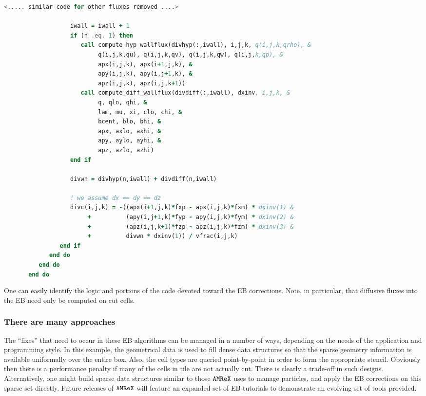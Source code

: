 \begin{lstlisting}[language=Fortran]
           <..... similar code for other fluxes removed ....>

                   iwall = iwall + 1
                   if (n .eq. 1) then
                      call compute_hyp_wallflux(divhyp(:,iwall), i,j,k, q(i,j,k,qrho), &
                           q(i,j,k,qu), q(i,j,k,qv), q(i,j,k,qw), q(i,j,k,qp), &
                           apx(i,j,k), apx(i+1,j,k), &
                           apy(i,j,k), apy(i,j+1,k), &
                           apz(i,j,k), apz(i,j,k+1))
                      call compute_diff_wallflux(divdiff(:,iwall), dxinv, i,j,k, &
                           q, qlo, qhi, &
                           lam, mu, xi, clo, chi, &
                           bcent, blo, bhi, &
                           apx, axlo, axhi, &
                           apy, aylo, ayhi, &
                           apz, azlo, azhi)
                   end if

                   divwn = divhyp(n,iwall) + divdiff(n,iwall)

                   ! we assume dx == dy == dz
                   divc(i,j,k) = -((apx(i+1,j,k)*fxp - apx(i,j,k)*fxm) * dxinv(1) &
                        +          (apy(i,j+1,k)*fyp - apy(i,j,k)*fym) * dxinv(2) &
                        +          (apz(i,j,k+1)*fzp - apz(i,j,k)*fzm) * dxinv(3) &
                        +          divwn * dxinv(1)) / vfrac(i,j,k)
                end if
             end do
          end do
       end do

\end{lstlisting}

One can easily identify the logic and portions of the code devoted toward the EB corrections.  Note, in particular,
that diffusive fluxes into the EB need only be computed on cut cells.

\subsubsection{There are many approaches}
The ``fixes'' that need to occur in these EB algorithms can be managed in a number of ways, depending on the
needs of the application and programming style.  In this example, the geometrical data is used to fill dense
data structures so that the sparse geometry information is available uniformally over the entire box.
Also, the cell types are queried point-by-point in order to form the appropriate stencil. Obviously then
there is a performance penalty if many of the cells in tile are not actually cut.  There is clearly a trade-off
in such designs.  Alternatively, one might build sparse data structures similar to those $\tt{AMReX}$ uses to manage
particles, and apply the EB corrections on this sparse set directly.  Future releases of $\tt{AMReX}$ will
feature an expanded set of EB tutorials to demonstrate an evolving set of tools provided.
